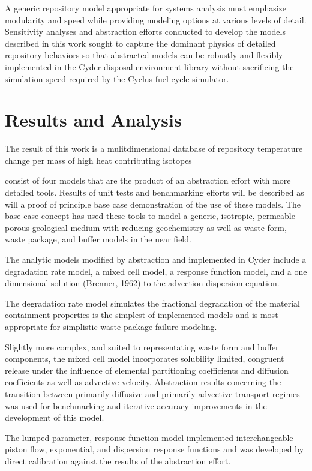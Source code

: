 \documentclass{anstrans}
\begin{document}
A generic repository model appropriate for systems analysis must emphasize 
modularity and speed while providing modeling options at various levels of 
detail. Sensitivity analyses and abstraction efforts conducted to develop the 
models described in this work sought to capture the dominant physics of detailed 
repository behaviors so that abstracted models can be robustly and flexibly 
implemented in the Cyder disposal environment library without sacrificing the 
simulation speed required by the Cyclus fuel cycle simulator.


\section{Results and Analysis}

The result of this work is a mulitdimensional database of repository temperature 
change per mass of high heat contributing isotopes 

consist of four models that are the product of an 
abstraction effort with more detailed tools. Results of unit tests and 
benchmarking efforts will be described as will a proof of principle base case 
demonstration of the use of these models. The base case concept has used these 
tools to model a generic, isotropic, permeable porous geological medium with 
reducing geochemistry as well as waste form, waste package, and buffer models in 
the near field.

The analytic models modified by abstraction and implemented in Cyder include a 
degradation rate model, a mixed cell model, a response function model, and a 
one dimensional solution (Brenner, 1962) to the advection-dispersion equation.

The degradation rate model simulates the fractional degradation of the material 
containment properties is the simplest of implemented models and is most 
appropriate for simplistic waste package failure modeling. 

Slightly more complex, and suited to representating waste form and buffer 
components, the mixed cell model incorporates solubility limited, congruent 
release under the influence of elemental partitioning coefficients and diffusion 
coefficients as well as advective velocity. Abstraction results concerning the 
transition between primarily diffusive and primarily advective transport regimes 
was used for benchmarking and iterative accuracy improvements in the development 
of this model.

The lumped parameter, response function model implemented interchangeable piston flow, 
exponential, and dispersion response functions and was developed by direct 
calibration against the results of the abstraction effort.  
\end{document}
